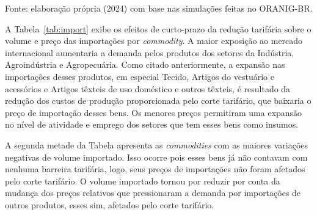 \begin{table}[H]
\begin{threeparttable}
\begin{tabular}{lcccc}
		\end{tabular}
	\begin{tablenotes}
		\footnotesize
		\item Fonte: elaboração própria (2024) com base nas simulações feitas no ORANIG-BR.
	\end{tablenotes}
	\end{threeparttable}
\end{table}



A Tabela~\ref{tab:import} exibe os efeitos de curto-prazo da redução tarifária sobre o volume e preço das importações por \textit{commodity}. A maior exposição ao mercado internacional aumentaria a demanda pelos produtos dos setores da Indústria, Agroindústria e Agropecuária. Como citado anteriormente, a expansão nas importações desses produtos, em especial Tecido, Artigos do vestuário e acessórios e Artigos têxteis de uso doméstico e outros têxteis, é resultado da redução dos custos de produção proporcionada pelo corte tarifário, que baixaria o preço de importação desses bens. Os menores preços permitiram uma expansão no nível de atividade e emprego dos setores que tem esses bens como insumos.

A segunda metade da Tabela apresenta as \textit{commodities} com as maiores variações negativas de volume importado. Isso ocorre pois esses bens já não contavam com nenhuma barreira tarifária, logo, seus preços de importações não foram afetados pelo corte tarifário. O volume importado tornou por reduzir por conta da mudança dos preços relativos que pressionaram a demanda por importações de outros produtos, esses sim, afetados pelo corte tarifário.


